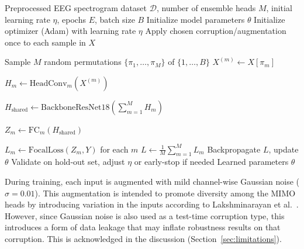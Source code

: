 \begin{algorithm}[H]
\caption{Training Procedure for MIMO ResNet-18 Model}
\label{alg:mimo_training}
\begin{algorithmic}[1]
\Require Preprocessed EEG spectrogram dataset $\mathcal{D}$, number of ensemble heads $M$, initial learning rate $\eta$, epochs $E$, batch size $B$
\State Initialize model parameters $\theta$
\State Initialize optimizer (Adam) with learning rate $\eta$
    \State Apply chosen corruption/augmentation once to each sample in $X$
    
    \State Sample $M$ random permutations $\{\pi_1, \dots, \pi_M\}$ of $\{1, \dots, B\}$
      \State $X^{(m)} \gets X[\pi_m]$ \hfill {}
    \EndFor
    
      \State $H_m \gets \text{HeadConv}_m(X^{(m)})$
    \EndFor

    \State $H_{\text{shared}} \gets \text{BackboneResNet18}\left( \sum_{m=1}^{M} H_m \right)$

      \State $Z_m \gets \text{FC}_m(H_{\text{shared}})$ \hfill {}
    \EndFor

    \State $L_m \gets \text{FocalLoss}(Z_m, Y)$ for each $m$
    \State $L \gets \frac{1}{M} \sum_{m=1}^{M} L_m$
    \State Backpropagate $L$, update $\theta$
  \EndFor
  \State Validate on hold-out set, adjust $\eta$ or early-stop if needed
\EndFor
\State \Return Learned parameters $\theta$
\end{algorithmic}
\end{algorithm}

During training, each input is augmented with mild channel-wise Gaussian noise ($\sigma=0.01$). This augmentation is intended to promote diversity among the MIMO heads by introducing variation in the inputs according to Lakshminarayan et al.~\cite{lakshminarayanan2017simple}. However, since Gaussian noise is also used as a test-time corruption type, this introduces a form of data leakage that may inflate robustness results on that corruption. This is acknowledged in the discussion (Section~\ref{sec:limitations}).

